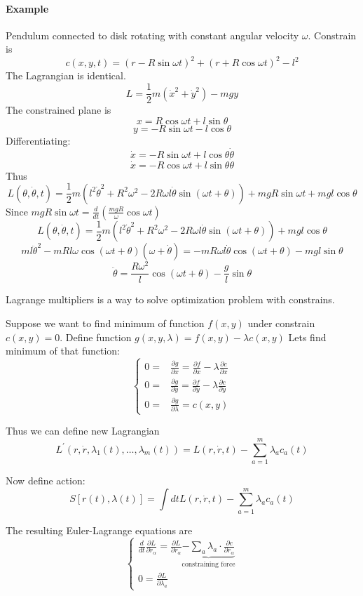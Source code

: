 \paragraph{Example}
Pendulum connected to disk rotating with constant angular velocity $\omega$. Constrain is
$$c(x,y,t) = (r - R\sin \omega t)^2 + (r + R\cos \omega t)^2 - l^2$$
The Lagrangian is identical. 
$$L = \frac{1}{2} m(\dot{x}^2+\dot{y}^2) - mgy$$
The constrained plane is
$$x = R\cos \omega t + l\sin \theta $$
$$y = -R\sin \omega t - l\cos \theta $$
Differentiating:
$$\dot{x} = -R\sin \omega t +l\cos \theta \dot{\theta} $$
$$\dot{x} = -R\cos \omega t + l\sin \theta \dot{\theta} $$
Thus
$$L(\theta, \dot{\theta}, t) = \frac{1}{2}m\left( l^2\dot{\theta}^2 +R^2\omega^2 - 2R\omega l \dot{\theta}\sin \left(\omega t + \theta\right)\right) +mgR\sin \omega t +mgl \cos \theta$$
Since $mgR\sin \omega t = \frac{d}{dt} \left( \frac{mgR}{\omega} \cos \omega t \right)$
$$L(\theta, \dot{\theta}, t) = \frac{1}{2}m\left( l^2\dot{\theta}^2 +R^2\omega^2 - 2R\omega l \dot{\theta}\sin \left(\omega t + \theta\right)\right)  +mgl \cos \theta$$
$$ml\ddot{\theta}^2-mRl\omega\cos (\omega t +\theta)(\omega+\dot{\theta}) = -mR\omega l \dot{\theta} \cos (\omega t + \theta) - mgl\sin \theta$$
$$\ddot{\theta} = \frac{R\omega^2}{l} \cos (\omega t + \theta) - \frac{g}{l}\sin \theta$$

Lagrange multipliers is a way to solve optimization problem with constrains. 

Suppose we want to find minimum of function $f(x,y)$ under constrain $c(x,y)=0$.
Define function $g(x,y,\lambda) = f(x,y) - \lambda c(x,y)$
Lets find minimum of that function:
$$\begin{cases}
0 =&\frac{\partial g}{\partial x} = \frac{\partial f}{\partial x}  - \lambda \frac{\partial c}{\partial x} \\
0 =&\frac{\partial g}{\partial y} = \frac{\partial f}{\partial y}  - \lambda \frac{\partial c}{\partial y} \\
0 =&\frac{\partial g}{\partial \lambda} = c(x,y)
\end{cases}$$

Thus we can define new Lagrangian
$$L^\prime\left( r,\dot{r},\lambda_1(t), \dots, \lambda_m(t) \right) = L(r, \dot{r}, t) - \sum_{a=1}^m \lambda_a c_a(t)$$

Now define action:
$$S\left[ r(t), \lambda(t) \right] = \int dt L(r,\dot{r}, t) - \sum_{a=1}^m \lambda_a c_a(t)$$

The resulting Euler-Lagrange equations are
$$\begin{cases}
\frac{d}{dt} \frac{\partial L}{\partial \dot{r}_\alpha} = \frac{\partial L}{\partial r_\alpha} \underbrace{- \sum_a \lambda_a \cdot \frac{\partial c}{\partial r_\alpha}}_{\text{constraining force}}\\
0 =\frac{\partial L}{\partial \lambda_a}
\end{cases}$$

